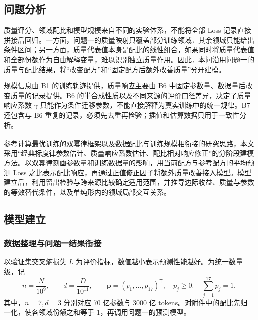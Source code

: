 \documentclass[bwprint]{gmcmthesis}
\numberwithin{equation}{section}
\numberwithin{figure}{section}
\numberwithin{table}{section}
\begin{document}
    \subsection{问题分析}
    质量评分、领域配比和模型规模来自不同的实验体系，不能将全部 Loss 记录直接拼接后回归。一方面，问题一的质量映射只覆盖部分训练领域，其余领域只能给出条件区间；另一方面，质量代表值本身是配比的线性组合，如果同时将质量代表值和全部份额作为自由解释变量，难以识别独立质量作用。因此，本问沿用问题一的质量与配比结果，将“改变配方”和“固定配方后额外改善质量”分开建模。

    规模信息由 B1 的训练轨迹提供，质量响应主要由 B6 中固定参数量、数据量后改变质量的记录提供。B6 的半合成性质以及不同来源的评价口径差异，决定了质量响应系数 $\gamma$ 只能作为条件迁移参数，不能直接解释为真实训练中的统一规律。B7 还包含与 B6 重复的记录，必须先去重再检验；插值和估算数据只用于一致性分析。

    参考计算最优训练的双幂律框架\textsuperscript{\cite{hoffmann2022chinchilla}}以及数据配比与训练规模相衔接的研究思路\textsuperscript{\cite{ye2025mixing}}，本文采用“经典标度律参数估计、质量响应系数估计、配比相对响应修正”的分阶段建模方法。以双幂律刻画参数量和训练数据量的影响，用当前配方与参考配方的平均预测 Loss 之比表示配比响应，再通过正值修正因子将额外质量改善接入模型。模型建立后，利用留出检验与跨来源比较确定适用范围，并推导边际收益、质量与参数的等效替代条件，以及单纯形内的领域局部交互关系。

    \subsection{模型建立}
        \subsubsection{数据整理与问题一结果衔接}  %
        以验证集交叉熵损失 $L$ 为评价指标，数值越小表示预测性能越好。为统一数量级，记
        \begin{equation}
         n=\frac{N}{10^9},\qquad d=\frac{D}{10^{11}},\qquad
         \bm p=(p_1,\ldots,p_{17})^\mathsf T,\quad
         p_j\geq0,\quad\sum_{j=1}^{17}p_j=1.
         \label{eq:p2_units}
        \end{equation}
        其中，$n=7,d=3$ 分别对应 70 亿参数与 3000 亿 tokens。对附件中的配比先归一化，使各领域份额之和等于 1，再调用问题一的预测模型。
        
\end{document}

